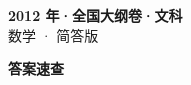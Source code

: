 \documentclass[zihao=-4, a4paper]{ctexart}
\begin{document}
\begin{center}
  {\Large\bfseries 2012 年·全国大纲卷·文科}\\[4pt]
  {\large 数学 · 简答版}
\end{center}
\medskip
{}

\clearpage
{}
\begin{center}{\Large\bfseries 答案速查}\end{center}
\medskip

\end{document}
